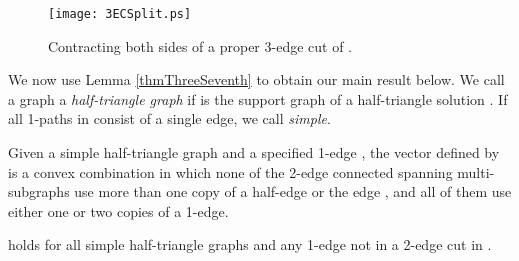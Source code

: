 \documentclass[oneeqnum,final]{siamltex1213}
\begin{document}
\begin{figure}
\begin{center}
\texttt{[image: 3ECSplit.ps]}
\end{center}
\caption{Contracting both sides of a proper 3-edge cut of .}
\label{3ECSplitting}
\end{figure}

We now use Lemma \ref{thmThreeSeventh} to obtain our main result below. We call a graph \mbox{} a \emph{half-triangle graph} if  is the support graph of a half-triangle solution . If all 1-paths in  consist of a single edge, we call  \emph{simple}.

\begin{definition}\label{defThm}
 Given a simple half-triangle graph  and a specified 1-edge , the vector  defined by
is a convex combination in which none of the 2-edge connected spanning multi-subgraphs use more than one copy of a half-edge or the edge , and all of them use either one or two copies of a 1-edge.
\end{definition}

\begin{theorem}\label{mainThm}
 holds for all simple half-triangle graphs  and any 1-edge  not in a 2-edge cut in .
\end{theorem}
\end{document}
